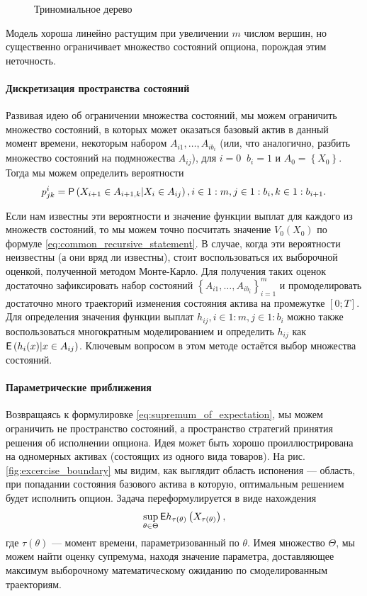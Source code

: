 \begin{figure}
\centering

\caption{Триномиальное дерево}
\label{fig:trinomial_tree}
\end{figure}

Модель хороша линейно растущим при увеличении $m$ числом вершин, но существенно ограничивает множество состояний опциона, порождая этим неточность.

\paragraph{Дискретизация пространства состояний}
Развивая идею об ограничении множества состояний, мы можем ограничить множество состояний, в которых может оказаться базовый актив в данный момент времени, некоторым набором $A_{i1}, \ldots, A_{ib_i}$ (или, что аналогично, разбить множество состояний на подмножества $A_{ij}$), для $i=0 \;\;b_i = 1$ и $A_0 = \left\lbrace X_0\right\rbrace$. Тогда мы можем определить вероятности $$p^i_{jk} = \mathsf{P}\left(X_{i+1}\in A_{i+1, k} \middle\vert X_i\in A_{ij}\right), i\in 1:m, j\in 1:b_i, k\in 1:b_{i+1}.$$

Если нам известны эти вероятности и значение функции выплат для каждого из множеств состояний, то мы можем точно посчитать значение $V_0\left(X_0\right)$ по формуле \eqref{eq:common_recursive_statement}. В случае, когда эти вероятности неизвестны (а они вряд ли известны), стоит воспользоваться их выборочной оценкой, полученной методом Монте-Карло. Для получения таких оценок достаточно зафиксировать набор состояний $\left\lbrace A_{i1}, \ldots, A_{ib_i}\right\rbrace_{i=1}^m$ и промоделировать достаточно много траекторий изменения состояния актива на промежутке $\left[0;T\right]$. Для определения значения функции выплат $h_{ij}, i \in 1:m, j\in 1:b_i$ можно также воспользоваться многократным моделированием и определить $h_{ij}$ как $\mathsf{E}\left( h_i(x)\middle\vert x\in A_{ij}\right)$. Ключевым вопросом в этом методе остаётся выбор множества состояний.

\paragraph{Параметрические приближения}
Возвращаясь к формулировке \eqref{eq:supremum_of_expectation}, мы можем ограничить не пространство состояний, а пространство стратегий принятия решения об исполнении опциона. Идея может быть хорошо проиллюстрирована на одномерных активах (состоящих из одного вида товаров). На рис. \ref{fig:excercise_boundary} мы видим, как выглядит область испонения --- область, при попадании состояния базового актива в которую, оптимальным решением будет исполнить опцион. Задача переформулируется в виде нахождения
$$\sup_{\theta \in \Theta} \mathsf{E} h_{\tau(\theta)}\left(X_{\tau\left(\theta\right)}\right),$$ 
где $\tau\left(\theta\right)$ --- момент времени, параметризованный по $\theta$. Имея множество $\Theta$, мы можем найти оценку супремума, находя значение параметра, доставляющее максимум выборочному математическому ожиданию по смоделированным траекториям.

